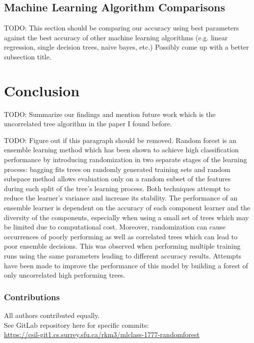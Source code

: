 \documentclass{article} %
\begin{document}
\subsection{Machine Learning Algorithm Comparisons}
TODO:  This section should be comparing our accuracy using best parameters against the best accuracy of other machine learning algorithms (e.g. linear regression, single decision trees, naive bayes, etc.)  Possibly come up with a better subsection title.


\section{Conclusion}
TODO: Summarize our findings and mention future work which is the uncorrelated tree algorithm in the paper I found before.

TODO: Figure out if this paragraph should be removed.
Random forest is an ensemble learning method which has been shown to achieve high classification performance by introducing randomization in two separate stages of the learning process: bagging fits trees on randomly generated training sets and random subspace method allows evaluation only on a random subset of the features during each split of the tree’s learning process. Both techniques attempt to reduce the learner’s variance and increase its stability. The performance of an ensemble learner is dependent on the accuracy of each component learner and the diversity of the components, especially when using a small set of trees which may be limited due to computational cost. Moreover, randomization can cause occurrences of poorly performing as well as correlated trees which can lead to poor ensemble decisions. This was observed when performing multiple training runs using the same parameters leading to different accuracy results. Attempts have been made to improve the performance of this model by building a forest of only uncorrelated high performing trees. \cite{Bharathidason2014}

\subsubsection*{Contributions}
All authors contributed equally.\\
See GitLab repository here for specific commits:\\
\href{
    https://csil-git1.cs.surrey.sfu.ca/rkm3/mlclass-1777-randomforest
}{
    https://csil-git1.cs.surrey.sfu.ca/rkm3/mlclass-1777-randomforest
}


\small{


}
\end{document}
